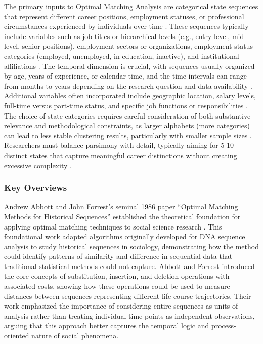 \documentclass[../main.tex]{subfiles}
\begin{document}
The primary inputs to Optimal Matching Analysis are categorical state sequences that represent different career positions, employment statuses, or professional circumstances experienced by individuals over time \parencite{sequence_analysis_wikipedia}. These sequences typically include variables such as job titles or hierarchical levels (e.g., entry-level, mid-level, senior positions), employment sectors or organizations, employment status categories (employed, unemployed, in education, inactive), and institutional affiliations \parencite{mapping_career_patterns, vannoni_john_career_progression}. The temporal dimension is crucial, with sequences usually organized by age, years of experience, or calendar time, and the time intervals can range from months to years depending on the research question and data availability \parencite{sequence_analysis_social_science}. Additional variables often incorporated include geographic location, salary levels, full-time versus part-time status, and specific job functions or responsibilities \parencite{employment_status_mobility}. The choice of state categories requires careful consideration of both substantive relevance and methodological constraints, as larger alphabets (more categories) can lead to less stable clustering results, particularly with smaller sample sizes \parencite{sequence_analysis_social_science}. Researchers must balance parsimony with detail, typically aiming for 5-10 distinct states that capture meaningful career distinctions without creating excessive complexity \parencite{sequence_analysis_social_science}.

\subsubsection{Key Overviews}

Andrew Abbott and John Forrest's seminal 1986 paper ``Optimal Matching Methods for Historical Sequences'' established the theoretical foundation for applying optimal matching techniques to social science research \parencite{abbott_forrest_1986}. This foundational work adapted algorithms originally developed for DNA sequence analysis to study historical sequences in sociology, demonstrating how the method could identify patterns of similarity and difference in sequential data that traditional statistical methods could not capture. Abbott and Forrest introduced the core concepts of substitution, insertion, and deletion operations with associated costs, showing how these operations could be used to measure distances between sequences representing different life course trajectories. Their work emphasized the importance of considering entire sequences as units of analysis rather than treating individual time points as independent observations, arguing that this approach better captures the temporal logic and process-oriented nature of social phenomena.
\end{document}
